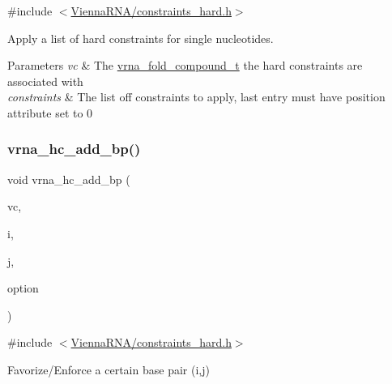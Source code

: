 {\ttfamily \#include $<$\mbox{\hyperlink{constraints__hard_8h}{Vienna\+R\+N\+A/constraints\+\_\+hard.\+h}}$>$}



Apply a list of hard constraints for single nucleotides. 


\begin{DoxyParams}{Parameters}
{\em vc} & The \mbox{\hyperlink{group__fold__compound_ga1b0cef17fd40466cef5968eaeeff6166}{vrna\+\_\+fold\+\_\+compound\+\_\+t}} the hard constraints are associated with \\
\hline
{\em constraints} & The list off constraints to apply, last entry must have position attribute set to 0 \\
\hline
\end{DoxyParams}
\mbox{\label{group__hard__constraints_ga7cba95ebe2ceb5ec9a5768f2232854fd}} 
\subsubsection{\texorpdfstring{vrna\+\_\+hc\+\_\+add\+\_\+bp()}{vrna\_hc\_add\_bp()}}
{\footnotesize\ttfamily void vrna\+\_\+hc\+\_\+add\+\_\+bp (\begin{DoxyParamCaption}\item[{\mbox{\hyperlink{group__fold__compound_ga1b0cef17fd40466cef5968eaeeff6166}{vrna\+\_\+fold\+\_\+compound\+\_\+t}} $\ast$}]{vc,  }\item[{int}]{i,  }\item[{int}]{j,  }\item[{unsigned char}]{option }\end{DoxyParamCaption})}



{\ttfamily \#include $<$\mbox{\hyperlink{constraints__hard_8h}{Vienna\+R\+N\+A/constraints\+\_\+hard.\+h}}$>$}



Favorize/\+Enforce a certain base pair (i,j) 

